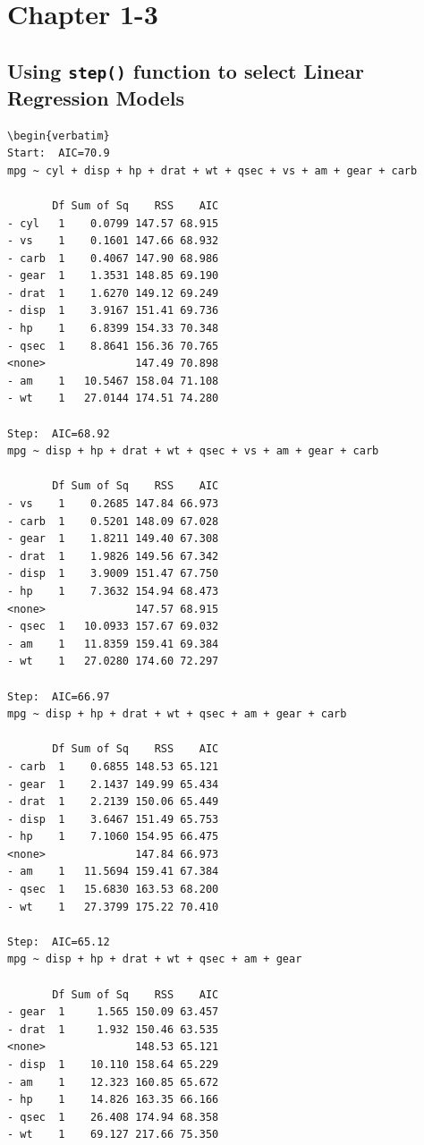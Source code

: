 \documentclass{article}\usepackage[]{graphicx}\usepackage[]{xcolor}
\begin{document}
\printbibliography %

\appendix %
\chapter{Chapter 1-3}
\section{Using \texttt{step()} function to select Linear Regression Models}\label{sec:codechunk1}
\begin{lstlisting}
\begin{verbatim}
Start:  AIC=70.9
mpg ~ cyl + disp + hp + drat + wt + qsec + vs + am + gear + carb

       Df Sum of Sq    RSS    AIC
- cyl   1    0.0799 147.57 68.915
- vs    1    0.1601 147.66 68.932
- carb  1    0.4067 147.90 68.986
- gear  1    1.3531 148.85 69.190
- drat  1    1.6270 149.12 69.249
- disp  1    3.9167 151.41 69.736
- hp    1    6.8399 154.33 70.348
- qsec  1    8.8641 156.36 70.765
<none>              147.49 70.898
- am    1   10.5467 158.04 71.108
- wt    1   27.0144 174.51 74.280

Step:  AIC=68.92
mpg ~ disp + hp + drat + wt + qsec + vs + am + gear + carb

       Df Sum of Sq    RSS    AIC
- vs    1    0.2685 147.84 66.973
- carb  1    0.5201 148.09 67.028
- gear  1    1.8211 149.40 67.308
- drat  1    1.9826 149.56 67.342
- disp  1    3.9009 151.47 67.750
- hp    1    7.3632 154.94 68.473
<none>              147.57 68.915
- qsec  1   10.0933 157.67 69.032
- am    1   11.8359 159.41 69.384
- wt    1   27.0280 174.60 72.297

Step:  AIC=66.97
mpg ~ disp + hp + drat + wt + qsec + am + gear + carb

       Df Sum of Sq    RSS    AIC
- carb  1    0.6855 148.53 65.121
- gear  1    2.1437 149.99 65.434
- drat  1    2.2139 150.06 65.449
- disp  1    3.6467 151.49 65.753
- hp    1    7.1060 154.95 66.475
<none>              147.84 66.973
- am    1   11.5694 159.41 67.384
- qsec  1   15.6830 163.53 68.200
- wt    1   27.3799 175.22 70.410

Step:  AIC=65.12
mpg ~ disp + hp + drat + wt + qsec + am + gear

       Df Sum of Sq    RSS    AIC
- gear  1     1.565 150.09 63.457
- drat  1     1.932 150.46 63.535
<none>              148.53 65.121
- disp  1    10.110 158.64 65.229
- am    1    12.323 160.85 65.672
- hp    1    14.826 163.35 66.166
- qsec  1    26.408 174.94 68.358
- wt    1    69.127 217.66 75.350


\end{lstlisting}
\end{document}
